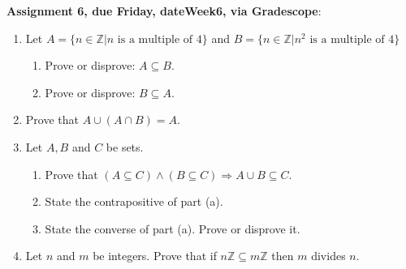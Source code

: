 \documentclass[12pt]{article}
\newcommand{\Z}{{\mathbb Z}}
\begin{document}
\smallskip
\noindent \textbf{Assignment 6, due Friday, \csname dateWeek6\endcsname, via Gradescope}:
\begin{enumerate}
\item Let $A = \{ n \in \Z | n \text{ is a multiple of } 4\}$ and $B = \{ n \in \Z | n^2 \text{ is a multiple of } 4\}$ 
 \begin{enumerate}
 \item Prove or disprove: $A \subseteq B$. 
 \item Prove or disprove: $B \subseteq A$. 
 \end{enumerate}

\item Prove that $A \cup (A \cap B) = A.$
\item Let $A,B$ and $C$ be sets. 
 \begin{enumerate}
 \item Prove that $(A \subseteq C) \wedge (B \subseteq C) \Rightarrow A \cup B \subseteq C$.
 \item State the contrapositive of part (a).
 \item State the converse of part (a). Prove or disprove it.
 \end{enumerate}
\item Let $n$ and $m$ be integers. Prove that if $n\Z \subseteq m\Z$ then $m$ divides $n$.
\end{enumerate}



\end{document}
